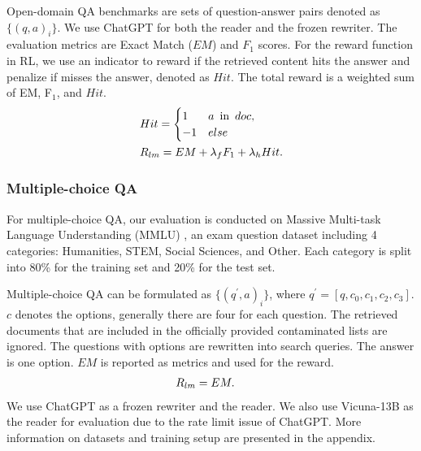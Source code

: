 Open-domain QA benchmarks are sets of question-answer pairs denoted as $\{(q, a)_i\}$.
We use ChatGPT for both the reader and the frozen rewriter.
The evaluation metrics are Exact Match ($EM$) and $F_{1}$ scores.
For the reward function in RL, we use an indicator to reward if the retrieved content hits the answer and penalize if misses the answer, denoted as $Hit$.
The total reward is a weighted sum of EM, F$_{1}$, and $Hit$.
\begin{equation}
\setlength{\abovedisplayskip}{6pt}
\setlength{\belowdisplayskip}{6pt}
\begin{split}
&Hit= \begin{cases}1 & a \enspace \text{in} \enspace doc, \\ -1 & else\end{cases} \\
&R_{lm} = EM + \lambda_{f} {F}_{1} + \lambda_{h} Hit.
\end{split}
\label{hit}
\end{equation}

\subsubsection{Multiple-choice QA}

For multiple-choice QA, our evaluation is conducted on
Massive Multi-task Language Understanding (MMLU) \cite{hendryckstest2021mmlu}, an exam question dataset including 4 categories: Humanities, STEM, Social Sciences, and Other. 
Each category is split into 80\% for the training set and 20\% for the test set.

Multiple-choice QA can be formulated as $\{(q^{\prime}, a)_i\}$, where $q^{\prime} = [q, c_0, c_1, c_2, c_3]$. $c$ denotes the options, generally there are four for each question. 
The retrieved documents that are included in the officially provided contaminated lists are ignored.
The questions with options are rewritten into search queries. The answer is one option. $EM$ is reported as metrics and used for the reward.
\begin{equation}
\setlength{\abovedisplayskip}{5pt}
\setlength{\belowdisplayskip}{5pt}
\begin{split}
&R_{lm} = EM.
\end{split}
\end{equation}
We use ChatGPT as a frozen rewriter and the reader. We also use Vicuna-13B as the reader for evaluation due to the rate limit issue of ChatGPT. 
More information on datasets and training setup are presented in the appendix.

